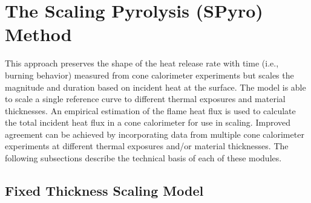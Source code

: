 \chapter{The Scaling Pyrolysis (SPyro) Method}
\label{spyro_appendix}

This approach preserves the shape of the heat release rate with time (i.e., burning behavior) measured from cone calorimeter experiments but scales the magnitude and duration based on incident heat at the surface.  The model is able to scale a single reference curve to different thermal exposures and material thicknesses. An empirical estimation of the flame heat flux is used to calculate the total incident heat flux in a cone calorimeter for use in scaling. Improved agreement can be achieved by incorporating data from multiple cone calorimeter experiments at different thermal exposures and/or material thicknesses. The following subsections describe the technical basis of each of these modules.

\section{Fixed Thickness Scaling Model}
\label{spyro_appendix:fixed}

